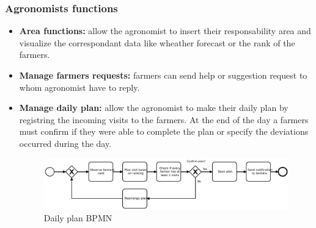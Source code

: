 \documentclass[table, 12pt]{article}
\begin{document}
\subsubsection{Agronomists functions}
\begin{itemize}
    \item \textbf{Area functions: }allow the agronomist to insert their responsability area and visualize the correspondant data like wheather forecast or the rank of the farmers.
    \item \textbf{Manage farmers requests: }farmers can send help or suggestion request to whom agronomist have to reply.
    \item \textbf{Manage daily plan: }allow the agronomist to make their daily plan by registring the incoming visits to the farmers. At the end of the day a farmers must confirm if they were able to complete the plan or specify the deviations occurred during the day.   
    \begin{center}
        \begin{figure}[!h]
            \includegraphics[width=\textwidth]{assets/DailyPlanBpmn}
            \caption{Daily plan BPMN}
            \label{fig: dailyplan}
        \end{figure}
    \end{center}
\end{itemize}
\end{document}
